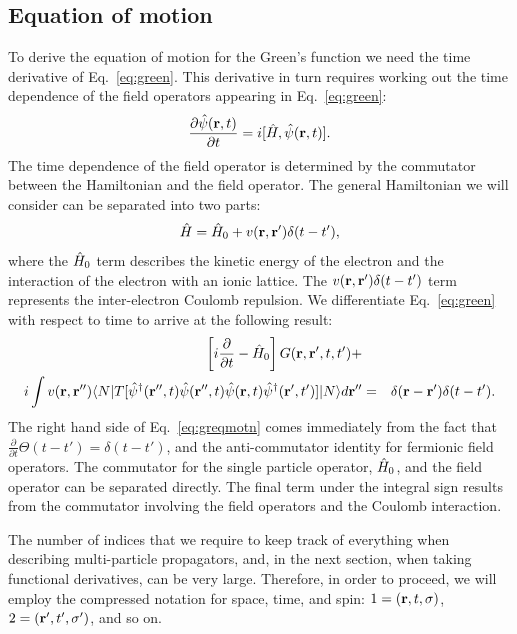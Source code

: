 \subsection{Equation of motion}
\noindent
To derive the equation of motion for the Green's 
function we need the time derivative of Eq.~\ref{eq:green}. 
This derivative in turn requires working out the time 
dependence of the field operators appearing in Eq.~\ref{eq:green}:
%
\begin{equation}
\frac{\partial \hat{\psi}({\bf r},t)}{\partial t} = i[\hat{H},\hat{\psi}({\bf r},t)].
\end{equation}
%
The time dependence of the field operator is determined by the 
commutator between the Hamiltonian and the field operator.
%
The general Hamiltonian we will consider can be separated into two parts:
%
\begin{equation}
\hat{H} =  \hat{H}_{0} + v({\bf r},{\bf r}')\delta(t-t'),
\end{equation}
%
where the $\hat{H}_{0}$ term describes the kinetic energy of the electron and the interaction of the 
electron with an ionic lattice. 
The $v({\bf r},{\bf r}')\delta(t-t')$ term represents the inter-electron Coulomb repulsion.
We differentiate Eq.~\ref{eq:green} with respect to time to arrive at the following result:
%
\begin{align}
\label{eq:greqmotn}
\left[i\frac{\partial}{\partial t} - \hat{H}_{0}\right]G({\bf r},{\bf r}',t,t') +  & &  \nonumber \\
i\int v({\bf r},{\bf r}'')\langle N| T[\hat{\psi}^{\dagger}({\bf r}'',t)\hat{\psi}({\bf r}'',t)\hat{\psi}({\bf r},t)\hat{\psi}^{\dagger}({\bf r^\prime},t')] |N \rangle d{\bf r}'' & = & \delta({\bf r}-{\bf r^\prime})\delta(t-t').
\end{align}
%
The right hand side of Eq.~\ref{eq:greqmotn} comes immediately from 
the fact that $\frac{\partial}{\partial t}\Theta(t-t') =\delta(t-t')$, 
and the anti-commutator identity for fermionic field operators. 
%
The commutator for the single particle operator, $\hat{H}_{0}$, and the 
field operator can be separated directly. 
The final term under the integral sign results from the commutator
involving the field operators and the Coulomb interaction.

The number of indices that we require to keep track of everything when 
describing multi-particle propagators, and, in the next section, 
when taking functional derivatives, can be very large. 
Therefore, in order to proceed, we will employ the compressed notation for space, 
time, and spin: $1 = ({\bf r},t,\sigma)$, $2=({\bf r}',t',\sigma')$, and so on.

